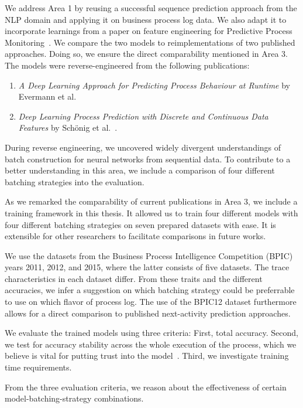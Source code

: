 We address Area 1 by reusing a successful sequence prediction approach from the NLP domain and applying it on business process log data. We also adapt it to incorporate learnings from a paper on feature engineering for Predictive Process Monitoring~\cite{klinkmuller2018reliablemonitoring}. We compare the two models to reimplementations of two published approaches. Doing so, we ensure the direct comparability mentioned in Area 3. The models were reverse-engineered from the following publications:

\begin{enumerate}
    \item\textit{A Deep Learning Approach for Predicting Process Behaviour at Runtime} by Evermann et al.~\cite{evermann2016}
    \item\textit{Deep Learning Process Prediction with Discrete and Continuous Data Features} by Schönig et al.~\cite{schoenig2018}.
\end{enumerate}

During reverse engineering, we uncovered widely divergent understandings of batch construction for neural networks from sequential data. To contribute to a better understanding in this area, we include a comparison of four different batching strategies into the evaluation.

As we remarked the comparability of current publications in Area 3, we include a training framework in this thesis. It allowed us to train four different models with four different batching strategies on seven prepared datasets with ease. It is extensible for other researchers to facilitate comparisons in future works.

We use the datasets from the Business Process Intelligence Competition (BPIC) years 2011, 2012, and 2015, where the latter consists of five datasets. The trace characteristics in each dataset differ. From these traits and the different accuracies, we infer a suggestion on which batching strategy could be preferrable to use on which flavor of process log. The use of the BPIC12 dataset furthermore allows for a direct comparison to published next-activity prediction approaches.

We evaluate the trained models using three criteria: First, total accuracy. Second, we test for accuracy stability across the whole execution of the process, which we believe is vital for putting trust into the model~\cite{francescomarino2015, boehmer2018probability}. Third, we investigate training time requirements.

From the three evaluation criteria, we reason about the effectiveness of certain model-batching-strategy combinations.

